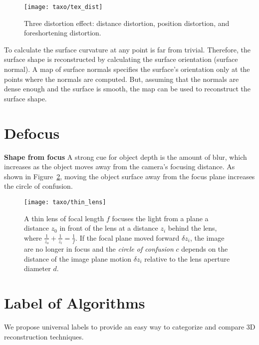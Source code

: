 \begin{figure}[h]
\centering
\texttt{[image: taxo/tex\_dist]}
\caption{Three distortion effect: distance distortion, position distortion, and foreshortening distortion.}
\label{fig:tex_dist}
\end{figure}

To calculate the surface curvature at any point is far from trivial. Therefore, the surface shape is reconstructed by calculating the surface orientation (surface normal). A map of surface normals specifies the surface's orientation only at the points where the normals are computed. But, assuming that the normals are dense enough and the surface is smooth, the map can be used to reconstruct the surface shape.

\section{Defocus}
\textbf{Shape from focus}
A strong cue for object depth is the amount of blur, which increases as the object moves away from the camera's focusing distance. As shown in Figure~\ref{fig:thin_lens}, moving the object surface away from the focus plane increases the circle of confusion.

\begin{figure}[h]
\centering
\texttt{[image: taxo/thin\_lens]}
\caption{A thin lens of focal length $f$ focuses the light from a plane a distance $z_0$ in front of the lens at a distance $z_i$ behind the lens, where $\frac{1}{z_o}+\frac{1}{z_i}=\frac{1}{f}$. If the focal plane moved forward $\delta z_i$, the image are no longer in focus and the \textit{circle of confusion} $c$ depends on the distance of the image plane motion $\delta z_i$ relative to the lens aperture diameter $d$.}
\label{fig:thin_lens}
\end{figure}

\section{Label of Algorithms}
We propose universal labels to provide an easy way to categorize and compare 3D reconstruction techniques.

